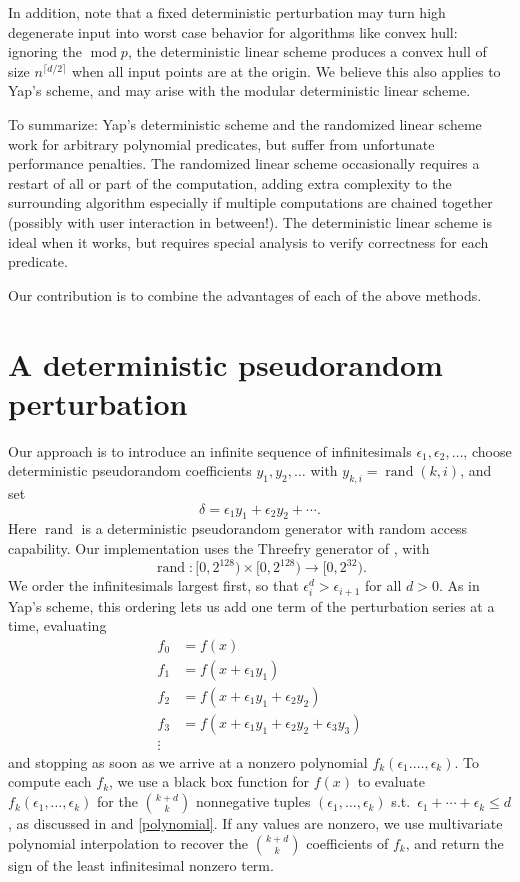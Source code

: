 \documentclass[11pt]{article}
\newcommand{\rand}{\operatorname{rand}}
\begin{document}
In addition, \cite{burnikel1994degeneracy} note that a fixed deterministic perturbation may turn high degenerate input into worst case behavior for algorithms
like convex hull: ignoring the $\operatorname{mod} p$, the deterministic linear scheme produces a convex hull of size $n^{\lceil d/2 \rceil}$ when all input
points are at the origin.  We believe this also applies to Yap's scheme, and may arise with the modular deterministic linear scheme.

To summarize: Yap's deterministic scheme and the randomized linear scheme work for arbitrary polynomial predicates, but suffer from unfortunate performance penalties.
The randomized linear scheme occasionally requires a restart of all or part of the computation, adding extra complexity to the surrounding algorithm
especially if multiple computations are chained together (possibly with user interaction in between!).  The deterministic linear scheme is ideal when it works,
but requires special analysis to verify correctness for each predicate.

Our contribution is to combine the advantages of each of the above methods.

\section{A deterministic pseudorandom perturbation}

Our approach is to introduce an infinite sequence of infinitesimals $\epsilon_1, \epsilon_2, \ldots$, choose deterministic pseudorandom coefficients $y_1, y_2, \ldots$
with $y_{k,i} = \rand(k,i)$, and set
$$\delta = \epsilon_1 y_1 + \epsilon_2 y_2 + \cdots.$$
Here $\rand$ is a deterministic pseudorandom generator with random access capability.  Our implementation uses the Threefry generator of
\cite{salmon2011random}, with
$$\rand : [0,2^{128}) \times [0,2^{128}) \to [0,2^{32}).$$
We order the infinitesimals largest first, so that $\epsilon_i^d > \epsilon_{i+1}$ for all $d > 0$.  As in Yap's scheme, this ordering lets us add one term of the
perturbation series at a time, evaluating
\begin{align*}
f_0 &= f(x) \\
f_1 &= f(x + \epsilon_1 y_1) \\
f_2 &= f(x + \epsilon_1 y_1 + \epsilon_2 y_2) \\
f_3 &= f(x + \epsilon_1 y_1 + \epsilon_2 y_2 + \epsilon_3 y_3) \\
\vdots
\end{align*}
and stopping as soon as we arrive at a nonzero polynomial $f_k(\epsilon_1. \ldots, \epsilon_k)$.
To compute each $f_k$, we use a black box function for $f(x)$ to evaluate $f_k(\epsilon_1, \ldots, \epsilon_k)$ for the $\binom{k+d}{k}$ nonnegative tuples $(\epsilon_1, \ldots, \epsilon_k)$
s.t.\ $\epsilon_1 + \cdots + \epsilon_k \le d$, as discussed in \cite{neidinger2009multivariable} and \autoref{polynomial}.  If any values are nonzero, we use multivariate
polynomial interpolation to recover the $\binom{k+d}{k}$ coefficients of $f_k$, and return the sign of the least infinitesimal nonzero term.
\end{document}
